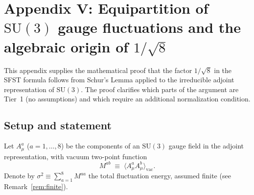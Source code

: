 
\section{Appendix V: Equipartition of $\mathrm{SU}(3)$ gauge fluctuations
  and the algebraic origin of $1/\sqrt{8}$}
\label{app:equipartition}

This appendix supplies the mathematical proof that the factor $1/\sqrt{8}$
in the SFST formula follows from Schur's Lemma applied to the irreducible
adjoint representation of $\mathrm{SU}(3)$.  The proof clarifies which
parts of the argument are Tier~1 (no assumptions) and which require an
additional normalization condition.

\subsection{Setup and statement}

Let $A^a_\mu$ ($a=1,\ldots,8$) be the components of an $\mathrm{SU}(3)$
gauge field in the adjoint representation, with vacuum two-point function
\[
  M^{ab} \;\equiv\; \bigl\langle A^a_\mu A^b_\mu \bigr\rangle_{\mathrm{vac}}.
\]
Denote by $\sigma^2 \equiv \sum_{a=1}^8 M^{aa}$ the total fluctuation energy,
assumed finite (see Remark~\ref{rem:finite}).

